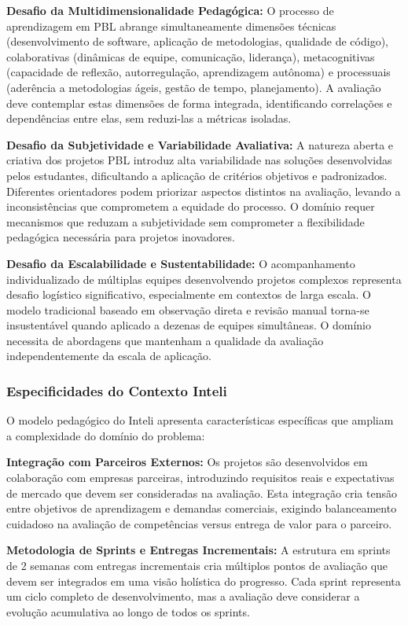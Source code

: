 \documentclass[english, spanish, brazilian]{modelo_dt}
\begin{document}
\textbf{Desafio da Multidimensionalidade Pedagógica:} O processo de aprendizagem em PBL abrange simultaneamente dimensões técnicas (desenvolvimento de software, aplicação de metodologias, qualidade de código), colaborativas (dinâmicas de equipe, comunicação, liderança), metacognitivas (capacidade de reflexão, autorregulação, aprendizagem autônoma) e processuais (aderência a metodologias ágeis, gestão de tempo, planejamento). A avaliação deve contemplar estas dimensões de forma integrada, identificando correlações e dependências entre elas, sem reduzi-las a métricas isoladas.

\textbf{Desafio da Subjetividade e Variabilidade Avaliativa:} A natureza aberta e criativa dos projetos PBL introduz alta variabilidade nas soluções desenvolvidas pelos estudantes, dificultando a aplicação de critérios objetivos e padronizados. Diferentes orientadores podem priorizar aspectos distintos na avaliação, levando a inconsistências que comprometem a equidade do processo. O domínio requer mecanismos que reduzam a subjetividade sem comprometer a flexibilidade pedagógica necessária para projetos inovadores.

\textbf{Desafio da Escalabilidade e Sustentabilidade:} O acompanhamento individualizado de múltiplas equipes desenvolvendo projetos complexos representa desafio logístico significativo, especialmente em contextos de larga escala. O modelo tradicional baseado em observação direta e revisão manual torna-se insustentável quando aplicado a dezenas de equipes simultâneas. O domínio necessita de abordagens que mantenham a qualidade da avaliação independentemente da escala de aplicação.

\subsubsection{Especificidades do Contexto Inteli}

O modelo pedagógico do Inteli apresenta características específicas que ampliam a complexidade do domínio do problema:

\textbf{Integração com Parceiros Externos:} Os projetos são desenvolvidos em colaboração com empresas parceiras, introduzindo requisitos reais e expectativas de mercado que devem ser consideradas na avaliação. Esta integração cria tensão entre objetivos de aprendizagem e demandas comerciais, exigindo balanceamento cuidadoso na avaliação de competências versus entrega de valor para o parceiro.

\textbf{Metodologia de Sprints e Entregas Incrementais:} A estrutura em sprints de 2 semanas com entregas incrementais cria múltiplos pontos de avaliação que devem ser integrados em uma visão holística do progresso. Cada sprint representa um ciclo completo de desenvolvimento, mas a avaliação deve considerar a evolução acumulativa ao longo de todos os sprints.
\end{document}
